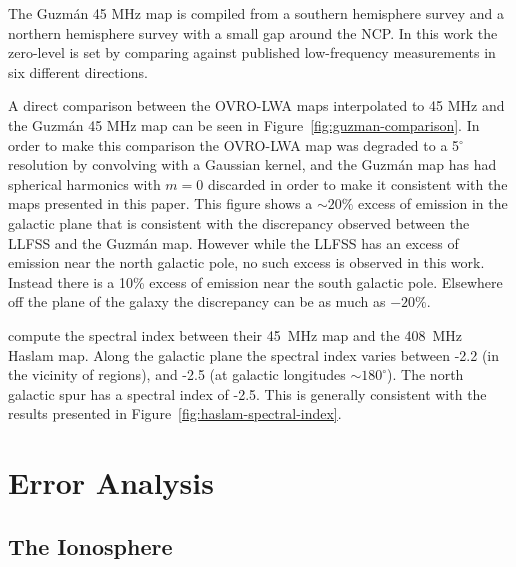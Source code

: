 \documentclass[twocolumn]{aastex61}
\begin{document}
The Guzm\'{a}n 45 MHz map \citep{2011A&A...525A.138G} is compiled from a southern hemisphere survey
\citep{1997A&AS..124..315A} and a northern hemisphere survey \citep{1999A&AS..140..145M} with a
small gap around the NCP. In this work the zero-level is set by comparing against published
low-frequency measurements in six different directions.

A direct comparison between the OVRO-LWA maps interpolated to 45 MHz and the Guzm\'{a}n 45 MHz map
can be seen in Figure~\ref{fig:guzman-comparison}. In order to make this comparison the OVRO-LWA map
was degraded to a 5$^\circ$ resolution by convolving with a Gaussian kernel, and the Guzm\'{a}n map
has had spherical harmonics with $m=0$ discarded in order to make it consistent with the maps
presented in this paper. This figure shows a $\sim20\%$ excess of emission in the galactic plane
that is consistent with the discrepancy observed between the LLFSS and the Guzm\'{a}n map.  However
while the LLFSS has an excess of emission near the north galactic pole, no such excess is observed
in this work. Instead there is a 10\% excess of emission near the south galactic pole. Elsewhere off
the plane of the galaxy the discrepancy can be as much as $-20\%$.

\citet{2011A&A...525A.138G} compute the spectral index between their 45~MHz map and the 408~MHz
Haslam map. Along the galactic plane the spectral index varies between -2.2 (in the vicinity of
 regions), and -2.5 (at galactic longitudes $\sim 180^\circ$). The north galactic spur has
a spectral index of -2.5. This is generally consistent with the results presented in
Figure~\ref{fig:haslam-spectral-index}.

\section{Error Analysis}\label{sec:error}

\subsection{The Ionosphere}\label{sec:ionosphere}
\end{document}
